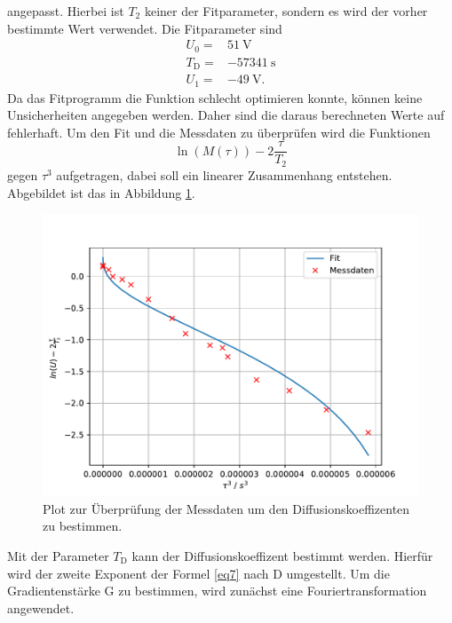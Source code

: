 angepasst.
Hierbei ist $T_{\text{2}}$ keiner der Fitparameter, sondern es wird der vorher bestimmte Wert verwendet.
Die Fitparameter sind
\begin{align*}
  U_{\text{0}}=&\SI{51}{\volt}\\
  T_{\text{D}} =& \SI{-57341}{\second}\\
  U_{\text{1}}=&\SI{-49}{\volt}.
\end{align*}
Da das Fitprogramm die Funktion schlecht optimieren konnte, können keine Unsicherheiten angegeben werden. Daher sind 
die daraus berechneten Werte auf fehlerhaft.
Um den Fit und die Messdaten zu überprüfen wird die Funktionen 
\begin{equation}
  \ln{\left(M(\tau)\right)}-2\frac{\tau}{T_{2}}
\end{equation}
gegen $\tau^3$ aufgetragen, dabei soll ein linearer Zusammenhang entstehen. Abgebildet ist das in Abbildung \ref{fig:Diff_fit}.
\begin{figure}
  \centering
  \includegraphics[width=\textwidth,keepaspectratio]{figure/Diff_plot.pdf}
  \caption{Plot zur Überprüfung der Messdaten um den Diffusionskoeffizenten zu bestimmen.}
  \label{fig:Diff_fit}
\end{figure}
Mit der Parameter $T_{\text{D}}$ kann der Diffusionskoeffizent bestimmt werden. Hierfür wird der zweite Exponent der Formel \eqref{eq7}
nach D umgestellt. Um die Gradientenstärke G zu bestimmen, wird zunächst eine Fouriertransformation angewendet.
\FloatBarrier
